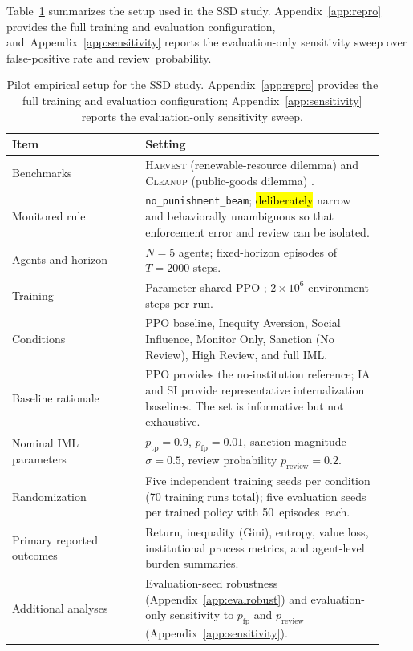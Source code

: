 \documentclass[mca,article,accept,pdftex,oneauthor]{Definitions/mdpi}
\begin{document}
Table~\ref{tab:empirical_setup} summarizes the setup used in the SSD study. Appendix~\ref{app:repro} provides the full training and evaluation configuration, and~Appendix~\ref{app:sensitivity} reports the evaluation-only sensitivity sweep over false-positive rate and review~probability.

\begin{table}[H]%

\caption{Pilot empirical setup for the SSD study. Appendix~\ref{app:repro} provides the full training and evaluation configuration; Appendix~\ref{app:sensitivity} reports the evaluation-only sensitivity sweep.}
\label{tab:empirical_setup}
\footnotesize
\resizebox{\columnwidth}{!} {
\begin{tabular}{p{0.33\linewidth}p{0.59\linewidth}}
\toprule
\textbf{Item} & \textbf{Setting} \\
\midrule
Benchmarks & \textsc{Harvest} (renewable-resource dilemma) and \textsc{Cleanup} (public-goods dilemma) \citep{Leibo2017SSD}. \\
Monitored rule & \texttt{no\_punishment\_beam}; \hl{deliberately} %
 narrow and behaviorally unambiguous so that enforcement error and review can be isolated. \\
Agents and horizon & $N=5$ agents; fixed-horizon episodes of $T=2000$ steps. \\
Training & Parameter-shared PPO \citep{Schulman2017PPO}; $2\times 10^6$ environment steps per run. \\
Conditions & PPO baseline, Inequity Aversion, Social Influence, Monitor Only, Sanction (No Review), High Review, and full IML. \\
Baseline rationale & PPO provides the no-institution reference; IA and SI provide representative internalization baselines. The set is informative but not exhaustive. \\
Nominal IML parameters & $p_{\mathrm{tp}}=0.9$, $p_{\mathrm{fp}}=0.01$, sanction magnitude $\sigma=0.5$, review probability $p_{\mathrm{review}}=0.2$. \\
Randomization & Five independent training seeds per condition (70 training runs total); five evaluation seeds per trained policy with \mbox{50 episodes each}. \\
Primary reported outcomes & Return, inequality (Gini), entropy, value loss, institutional process metrics, and agent-level burden summaries. \\
Additional analyses & Evaluation-seed robustness (Appendix~\ref{app:evalrobust}) and evaluation-only sensitivity to $p_{\mathrm{fp}}$ and $p_{\mathrm{review}}$ (Appendix~\ref{app:sensitivity}). \\
\bottomrule
\end{tabular}}
\end{table}
\end{document}
